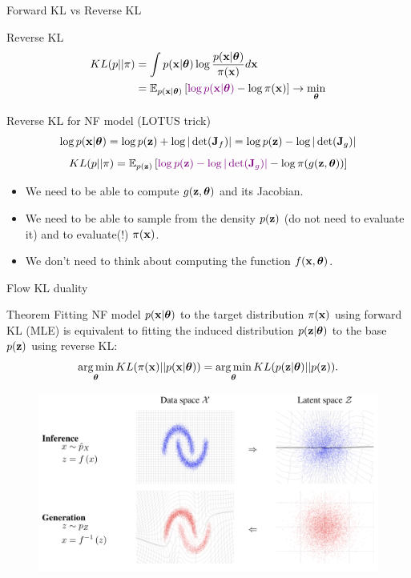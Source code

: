 \begin{frame}{Forward KL vs Reverse KL}
	\begin{block}{Reverse KL}
	  	\vspace{-0.5cm}
			\begin{align*}
				KL(p || \pi) &= \int p(\mathbf{x} | \boldsymbol{\theta}) \log \frac{p(\mathbf{x} | \boldsymbol{\theta})}{\pi(\mathbf{x})} d \mathbf{x} \\
				&= \mathbb{E}_{p(\mathbf{x} | \boldsymbol{\theta})} \left[{\color{violet}\log p(\mathbf{x} | \boldsymbol{\theta})} - \log \pi(\mathbf{x})\right] \rightarrow \min_{\boldsymbol{\theta}}
			\end{align*}
		\vspace{-0.7cm}
	\end{block}
	\begin{block}{Reverse KL for NF model (LOTUS trick)}
  		\vspace{-0.3cm}
		\[
			 \log p(\mathbf{x} | \boldsymbol{\theta}) = \log p(\mathbf{z}) +  \log  |\det (\mathbf{J}_f)| = \log p(\mathbf{z}) - \log |\det (\mathbf{J}_g)| 
		\]
		\[
			KL(p || \pi)  = \mathbb{E}_{p(\mathbf{z})} \left[ {\color{violet} \log p(\mathbf{z}) -  \log |\det (\mathbf{J}_g)| } - \log \pi(g(\mathbf{z}, \boldsymbol{\theta})) \right]
		\]
		\vspace{-0.3cm}
		\begin{itemize}
		\item We need to be able to compute $g(\mathbf{z}, \boldsymbol{\theta})$ and its Jacobian.
		\item We need to be able to sample from the density $p(\mathbf{z})$ (do not need to evaluate it) and to evaluate(!) $\pi(\mathbf{x})$.
		\item We don’t need to think about computing the function $f(\mathbf{x}, \boldsymbol{\theta})$.
		\end{itemize}
	\end{block}
\end{frame}
\begin{frame}{Flow KL duality}
	\begin{block}{Theorem}
		Fitting NF model $p(\mathbf{x}| \boldsymbol{\theta})$ to the target distribution $\pi(\mathbf{x})$ using forward KL (MLE) is equivalent to fitting the induced distribution $p(\mathbf{z}| \boldsymbol{\theta})$ to the base $p(\mathbf{z})$ using reverse KL:
		\vspace{-0.2cm}
		\[
			\operatorname*{arg\,min}_{\boldsymbol{\theta}} KL(\pi(\mathbf{x}) || p(\mathbf{x} | \boldsymbol{\theta})) = \operatorname*{arg\,min}_{\boldsymbol{\theta}} KL(p(\mathbf{z} | \boldsymbol{\theta}) || p(\mathbf{z})).
		\]
		\vspace{-0.7cm}
	\end{block}
	\begin{figure}
		\includegraphics[width=0.85\linewidth]{figs/flows_how2}
	\end{figure}
\end{frame}
